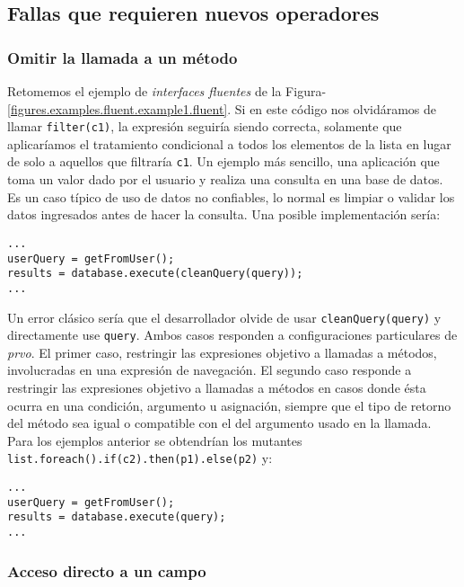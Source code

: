 \subsection{Fallas que requieren nuevos operadores}

\subsubsection{Omitir la llamada a un m\'etodo}

Retomemos el ejemplo de \emph{interfaces fluentes} de la Figura-\ref{figures.examples.fluent.example1.fluent}. Si en este c\'odigo nos olvid\'aramos de llamar \texttt{filter(c1)}, la expresi\'on seguir\'ia siendo correcta, solamente que aplicar\'iamos el tratamiento condicional a todos los elementos de la lista en lugar de solo a aquellos que filtrar\'ia \texttt{c1}. Un ejemplo m\'as sencillo, una aplicaci\'on que toma un valor dado por el usuario y realiza una consulta en una base de datos. Es un caso t\'ipico de uso de datos no confiables, lo normal es limpiar o validar los datos ingresados antes de hacer la consulta. Una posible implementaci\'on ser\'ia:
\begin{lstlisting}
...
userQuery = getFromUser();
results = database.execute(cleanQuery(query));
...
\end{lstlisting}
Un error cl\'asico ser\'ia que el desarrollador olvide de usar \texttt{cleanQuery(query)} y directamente use \texttt{query}. Ambos casos responden a configuraciones particulares de \emph{prvo}. El primer caso, restringir las expresiones objetivo a llamadas a m\'etodos, involucradas en una expresi\'on de navegaci\'on. El segundo caso responde a restringir las expresiones objetivo a llamadas a m\'etodos en casos donde \'esta ocurra en una condici\'on, argumento u asignaci\'on, siempre que el tipo de retorno del m\'etodo sea igual o compatible con el del argumento usado en la llamada. Para los ejemplos anterior se obtendr\'ian los mutantes \lstinline|list.foreach().if(c2).then(p1).else(p2)| y:
\begin{lstlisting}
...
userQuery = getFromUser();
results = database.execute(query);
...
\end{lstlisting}

\subsubsection{Acceso directo a un campo}


